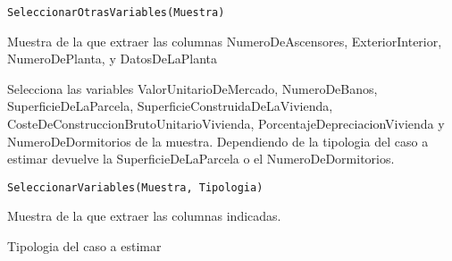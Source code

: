 \documentclass[a4paper]{book}
\begin{document}
%
\begin{Usage}
\begin{verbatim}
SeleccionarOtrasVariables(Muestra)
\end{verbatim}
\end{Usage}
%
\begin{Arguments}
\begin{ldescription}
\item[\code{Muestra}] Muestra de la que extraer las columnas NumeroDeAscensores, ExteriorInterior, NumeroDePlanta, y DatosDeLaPlanta

\end{ldescription}
\end{Arguments}
%
\begin{Description}\relax
Selecciona las variables ValorUnitarioDeMercado, NumeroDeBanos, SuperficieDeLaParcela, SuperficieConstruidaDeLaVivienda, CosteDeConstruccionBrutoUnitarioVivienda, PorcentajeDepreciacionVivienda y NumeroDeDormitorios de la muestra. Dependiendo de la tipologia del caso a estimar devuelve la SuperficieDeLaParcela o el NumeroDeDormitorios.
\end{Description}
%
\begin{Usage}
\begin{verbatim}
SeleccionarVariables(Muestra, Tipologia)
\end{verbatim}
\end{Usage}
%
\begin{Arguments}
\begin{ldescription}
\item[\code{Muestra}] Muestra de la que extraer las columnas indicadas.

\item[\code{Tipologia}] Tipologia del caso a estimar
\end{ldescription}
\end{Arguments}
\end{document}
